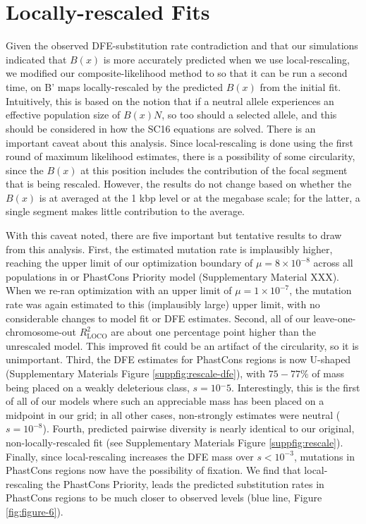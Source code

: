 \documentclass[11pt]{article}
\begin{document}
\section*{Locally-rescaled Fits}

Given the observed DFE-substitution rate contradiction and that our simulations
indicated that $B(x)$ is more accurately predicted when we use local-rescaling,
we modified our composite-likelihood method to so that it can be run a second
time, on B' maps locally-rescaled by the predicted $\widehat{B}(x)$ from the
initial fit. Intuitively, this is based on the notion that if a neutral allele
experiences an effective population size of $B(x)N$, so too should a selected
allele, and this should be considered in how the SC16 equations are solved.
There is an important caveat about this analysis. Since local-rescaling is done
using the first round of maximum likelihood estimates, there is a possibility
of some circularity, since the $B(x)$ at this position includes the
contribution of the focal segment that is being rescaled. However, the results
do not change based on whether the $B(x)$ is at averaged at the 1 kbp level or
at the megabase scale; for the latter, a single segment makes little
contribution to the average. 

With this caveat noted, there are five important but tentative results to draw
from this analysis. First, the estimated mutation rate is implausibly higher,
reaching the upper limit of our optimization boundary of $\mu = 8 \times
10^{-8}$ across all populations in or PhastCons Priority model (Supplementary
Material XXX). When we re-ran optimization with an upper limit of $\mu = 1
\times 10^{-7}$, the mutation rate was again estimated to this (implausibly
large) upper limit, with no considerable changes to model fit or DFE estimates.
Second, all of our leave-one-chromosome-out $R_\text{LOCO}^2$ are about one
percentage point higher than the unrescaled model. This improved fit could be
an artifact of the circularity, so it is unimportant. Third, the DFE estimates
for PhastCons regions is now U-shaped (Supplementary Materials Figure
\ref{suppfig:rescale-dfe}), with $75-77\%$ of mass being placed on a weakly
deleterious class, $s=10{^-5}$. Interestingly, this is the first of all of our
models where such an appreciable mass has been placed on a midpoint in our
grid; in all other cases, non-strongly estimates were neutral ($s=10^{-8}$).
Fourth, predicted pairwise diversity is nearly identical to our original,
non-locally-rescaled fit (see Supplementary Materials Figure
\ref{suppfig:rescale}). Finally, since local-rescaling increases the DFE mass
over $s < 10^{-3}$, mutations in PhastCons regions now have the possibility of
fixation. We find that local-rescaling the PhastCons Priority, leads the
predicted substitution rates in PhastCons regions to be much closer to observed
levels (blue line, Figure \ref{fig:figure-6}).
\end{document}
